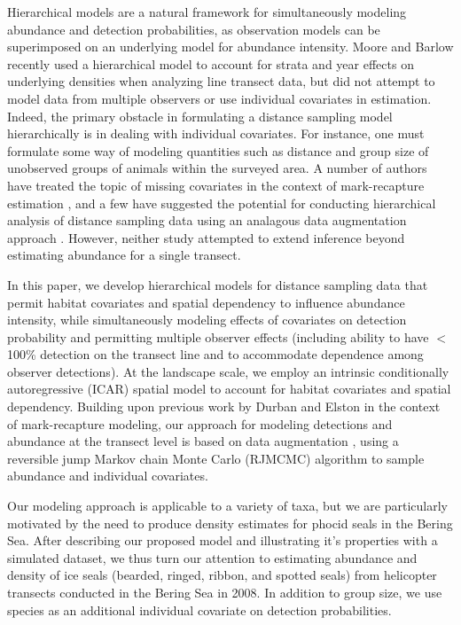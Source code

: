 \documentclass[10pt]{article}
\begin{document}
Hierarchical models are a natural framework for simultaneously modeling abundance and detection probabilities, as observation models can be superimposed on an underlying model for abundance intensity.  Moore and Barlow \cite{MooreBarlow2011} recently used a hierarchical model to account for strata and year effects on underlying densities when analyzing line transect data, but did not attempt to model data from multiple observers or use individual covariates in estimation. Indeed, the primary obstacle in formulating a distance sampling model hierarchically is in dealing with individual covariates.  For instance, one must formulate some way of modeling quantities such as distance and group size of unobserved groups of animals within the surveyed area.  A number of authors have treated the topic of missing covariates in the context of mark-recapture estimation \cite{DurbanElston2005,RoyleDorazio2008,Royle2009,SchofieldBarker2011},
and a few have suggested the potential for conducting hierarchical analysis of distance sampling data using an analagous data augmentation approach \cite{RoyleDorazio2008,LinkBarker2010}.  However, neither study attempted to extend inference beyond estimating abundance for a single transect.

In this paper, we develop hierarchical models for distance sampling data that permit habitat covariates and spatial dependency to influence abundance intensity, while simultaneously modeling effects of covariates on detection probability and permitting multiple observer effects (including ability to have $<$100\% detection on the transect line and to accommodate dependence among observer detections).  At the landscape scale, we employ an intrinsic conditionally autoregressive (ICAR) spatial model \cite{BesagEtAl1991,BesagKooperberg1995,RueHeld2005} to account for habitat covariates and spatial dependency.  Building upon previous work by Durban and Elston \cite{DurbanElston2005} in the context of mark-recapture modeling, our approach for modeling detections and abundance at the transect level is based on data augmentation \cite{TannerWong1987,RoyleEtAl2007b}, using a reversible jump Markov chain Monte Carlo (RJMCMC) algorithm \cite{CarlinChib1995,Green1995} to sample abundance and individual covariates.

Our modeling approach is applicable to a variety of taxa, but we are particularly motivated by the need to produce density estimates for phocid seals in the Bering Sea.  After describing our proposed model and illustrating it's properties with a simulated dataset, we thus turn our attention to estimating abundance and density of ice seals (bearded, ringed, ribbon, and spotted seals) from helicopter transects conducted in the Bering Sea in 2008.  In addition to group size, we use species as an additional individual covariate on detection probabilities.
\end{document}
